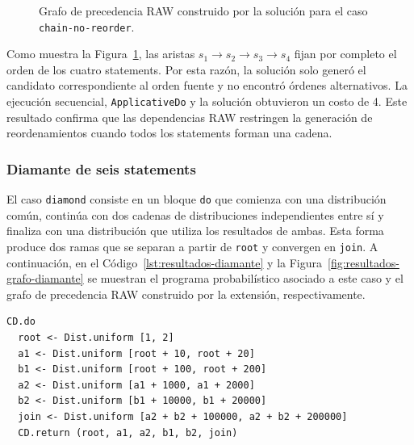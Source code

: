 \begin{figure}[ht]
\centering
\begin{PrecedenceGraph}
\end{PrecedenceGraph}
\caption[Grafo RAW del caso \texttt{chain-no-reorder}.]{Grafo de precedencia RAW construido por la solución para el caso \texttt{chain-no-reorder}.}
\label{fig:resultados-grafo-cadena}
\end{figure}

Como muestra la Figura~\ref{fig:resultados-grafo-cadena}, las aristas $s_1\to s_2\to s_3\to s_4$ fijan por completo el orden de los cuatro statements. Por esta razón, la solución solo generó el candidato correspondiente al orden fuente y no encontró órdenes alternativos. La ejecución secuencial, \texttt{ApplicativeDo} y la solución obtuvieron un costo de 4. Este resultado confirma que las dependencias RAW restringen la generación de reordenamientos cuando todos los statements forman una cadena.

\subsubsection{Diamante de seis statements}

El caso \texttt{diamond} consiste en un bloque \texttt{do} que comienza con una distribución común, continúa con dos cadenas de distribuciones independientes entre sí y finaliza con una distribución que utiliza los resultados de ambas. Esta forma produce dos ramas que se separan a partir de \texttt{root} y convergen en \texttt{join}. A continuación, en el Código~\ref{lst:resultados-diamante} y la Figura~\ref{fig:resultados-grafo-diamante} se muestran el programa probabilístico asociado a este caso y el grafo de precedencia RAW construido por la extensión, respectivamente.

\begin{lstlisting}[style=haskell,caption={Programa probabilístico asociado al caso \texttt{diamond}.},label={lst:resultados-diamante}]
CD.do
  root <- Dist.uniform [1, 2]
  a1 <- Dist.uniform [root + 10, root + 20]
  b1 <- Dist.uniform [root + 100, root + 200]
  a2 <- Dist.uniform [a1 + 1000, a1 + 2000]
  b2 <- Dist.uniform [b1 + 10000, b1 + 20000]
  join <- Dist.uniform [a2 + b2 + 100000, a2 + b2 + 200000]
  CD.return (root, a1, a2, b1, b2, join)
\end{lstlisting}

